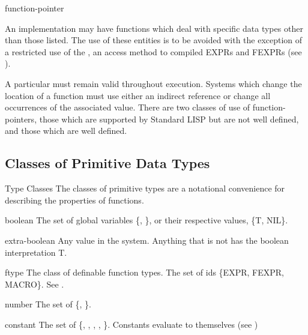 \begin{Type}{function-pointer}

 An  implementation  may have  functions  which  deal
     with  specific data  types other  than those  listed.   The  use
     of  these entities  is to  be avoided  with the  exception of  a
     restricted  use of  the ,  an  access method  to
     compiled EXPRs  and FEXPRs (see ).  

     A particular 
       must
     remain  valid throughout execution.   Systems  which change  the
     location of a function must use either an  indirect reference or
     change all occurrences  of the associated value.  There are  two
     classes of  use of function-pointers, those which are  supported
     by Standard LISP  but are not well defined, and those which  are
     well defined.
\end{Type}

\subsection{Classes of Primitive Data Types}
\begin{Introduction}{Type Classes}
The classes of primitive types are a notational convenience for
describing the properties of functions.
\end{Introduction}

\begin{Type}{boolean}
The  set of  global variables  \{, \}, or  their  respective
     values, \{T, NIL\}.
\end{Type}

\begin{Type}{extra-boolean}
Any value in the system.  Anything that is not  has
     the boolean interpretation T.
\end{Type}

\begin{Type}{ftype}
 The class of definable  function types.  The set of ids \{EXPR,
     FEXPR, MACRO\}. See .
\end{Type}

\begin{Type}{number}
The set of \{, \}.
\end{Type}


\begin{Type}{constant}
The set  of \{,  , ,  
      ,   \}.  
    Constants evaluate to themselves (see  )
\end{Type}


